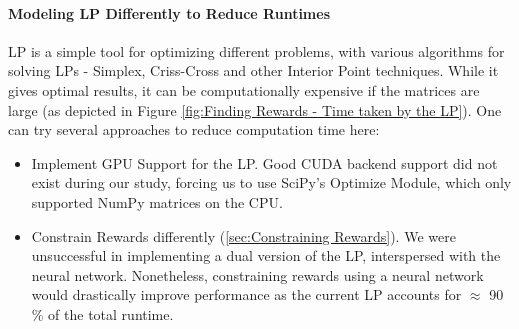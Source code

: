 \documentclass[12pt]{article}
\begin{document}
    \paragraph{Modeling LP Differently to Reduce Runtimes} LP is a simple tool for optimizing different problems, with various algorithms for solving LPs - Simplex, Criss-Cross and other Interior Point techniques. While it gives optimal results, it can be computationally expensive if the matrices are large (as depicted in Figure \ref{fig:Finding Rewards - Time taken by the LP}). One can try several approaches to reduce computation time here:
    \begin{itemize}
        \item Implement GPU Support for the LP. Good CUDA backend support did not exist during our study, forcing us to use SciPy's Optimize Module, which only supported NumPy matrices on the CPU.
        \item Constrain Rewards differently (\cref{sec:Constraining Rewards}). We were unsuccessful in implementing a dual version of the LP, interspersed with the neural network. Nonetheless, constraining rewards using a neural network would drastically improve performance as the current LP accounts for $\approx$ 90 \% of the total runtime.
    \end{itemize}

    
    
    
    \cleardoublepage
    
\end{document}

